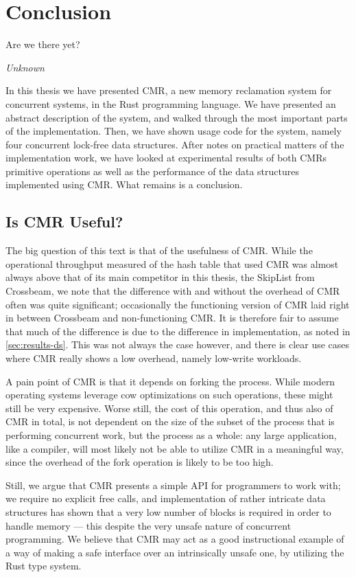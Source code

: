 \chapter{Conclusion\label{ch:conclusion}}
\epigraph{Are we there yet?}{\textit{Unknown}}

In this thesis we have presented CMR, a new memory reclamation system for concurrent systems, in
the Rust programming language. We have presented an abstract description of the system, and walked
through the most important parts of the implementation. Then, we have shown usage code for the
system, namely four concurrent lock-free data structures. After notes on practical matters of the
implementation work, we have looked at experimental results of both CMRs primitive operations as
well as the performance of the data structures implemented using CMR\@. What remains is a
conclusion.

\clearpage

\section{Is CMR Useful?}

The big question of this text is that of the usefulness of CMR\@. While the operational throughput
measured of the hash table that used CMR was almost always above that of its main competitor in
this thesis, the SkipList from Crossbeam, we note that the difference with and without the overhead
of CMR often was quite significant; occasionally the functioning version of CMR laid right in
between Crossbeam and non-functioning CMR\@.  It is therefore fair to assume that much of the
difference is due to the difference in implementation, as noted in \cref{sec:results-ds}. This was
not always the case however, and there is clear use cases where CMR really shows a low overhead,
namely low-write workloads.

A pain point of CMR is that it depends on forking the process. While modern operating systems
leverage \gls{cow} optimizations on such operations, these might still be very expensive.  Worse
still, the cost of this operation, and thus also of CMR in total, is not dependent on the size of
the subset of the process that is performing concurrent work, but the process as a whole: any large
application, like a compiler, will most likely not be able to utilize CMR in a meaningful way,
since the overhead of the fork operation is likely to be too high.

Still, we argue that CMR presents a simple API for programmers to work with; we require no explicit
free calls, and implementation of rather intricate data structures has shown that a very low number
of  blocks is required in order to handle memory --- this despite the very unsafe
nature of concurrent programming. We believe that CMR may act as a good instructional example of
a way of making a safe interface over an intrinsically unsafe one, by utilizing the Rust type system.


